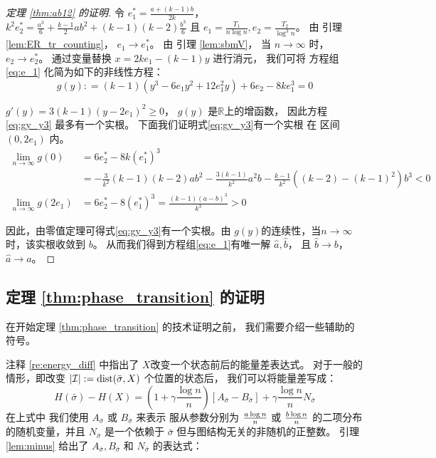 \begin{proof}[定理 \ref{thm:ab12} 的证明]
	令 $e^*_1 = \frac{a+(k-1)b}{2k}$， $k^2 e^*_2 = \frac{a^3}{6} + \frac{k-1}{2}ab^2 + (k-1)(k-2)\frac{b^3}{6}$
	且 $e_1 = \frac{T_1}{n\log n}, e_2 = \frac{T_2}{\log^3 n}$。
	由 引理
  \ref{lem:ER_tr_counting}， $e_1 \to e^*_1$。
	由 引理 \ref{lem:sbmV}， 当 $n\to \infty$ 时，
  $e_2 \to e^*_2$。
	通过变量替换 $x=2ke_1 - (k-1)y$ 进行消元，
  我们可将
  方程组\eqref{eq:e_1}
  化简为如下的非线性方程：
\begin{equation}\label{eq:gy_y3}
g(y): = (k-1)(y^3 - 6 e_1 y^2 + 12 e_1^2 y) + 6 e_2 - 8 k e_1^3 = 0
\end{equation}

$g'(y) = 3(k-1)(y-2e_1)^2 \geq 0 $，
$g(y)$ 是$\mathbb{R}$上的增函数，
因此方程\eqref{eq:gy_y3} 最多有一个实根。
下面我们证明式\eqref{eq:gy_y3}有一个实根
在 区间 $(0, 2e_1)$ 内。
\begin{align*}
\lim_{n\to \infty}g(0) &=  6e^*_2 - 8k(e^*_1)^3  \\
&=-\frac{3}{k^2}(k-1)(k-2)ab^2-\frac{3(k-1)}{k^2}a^2b - \frac{k-1}{k^2} ((k-2)-(k-1)^2)b^3 < 0 \\
\lim_{n\to \infty}g(2e_1) &= 6e^*_2 - 8(e^*_1)^3 = \frac{(k-1)(a-b)^3}{k^3} > 0
\end{align*}

因此，由零值定理可得式\eqref{eq:gy_y3}有一个实根。由 $g(y)$的连续性，当$n\to \infty $ 时，该实根收敛到 $b$。
从而我们得到方程组\eqref{eq:e_1}有唯一解 $\hat{a},\hat{b}$，
且
$\hat{b} \to b$， $\hat{a} \to a$。
\end{proof}




\subsection{定理 \ref{thm:phase_transition} 的证明}
\label{sec:appendix_theorem_proof_phase_trans}

在开始定理 \ref{thm:phase_transition} 的技术证明之前，
我们需要介绍一些辅助的
符号。


注释 \ref{re:energy_diff} 中指出了
$X$改变一个状态前后的能量差表达式。
对于一般的情形，即改变
$|\mathcal{I}|:=\operatorname{dist}(\bar{\sigma}, X)$
个位置的状态后，
我们可以将能量差写成：
\begin{equation}\label{eq:Hgeneral}
H(\bar{\sigma}) - H(X)=
\left(1 + \gamma \frac{ \log n}{n} \right)[A_{\bar{\sigma}} - B_{\bar{\sigma}}] + \gamma\frac{ \log n}{n} N_{\bar{\sigma}}
\end{equation}
在上式中 我们使用
$A_{\bar{\sigma}}$ 或
$B_{\bar{\sigma}}$ 来表示
服从参数分别为 $\frac{a \log n}{n}$ 或 $\frac{b \log n}{n}$ 的二项分布的随机变量，并且
$N_{\bar{\sigma}}$ 是一个依赖于 $\bar{\sigma}$ 但与图结构无关的非随机的正整数。
引理 \ref{lem:minus}  给出了 $A_{\bar{\sigma}}, B_{\bar{\sigma}}$ 和 $N_{\bar{\sigma}}$
的表达式：

